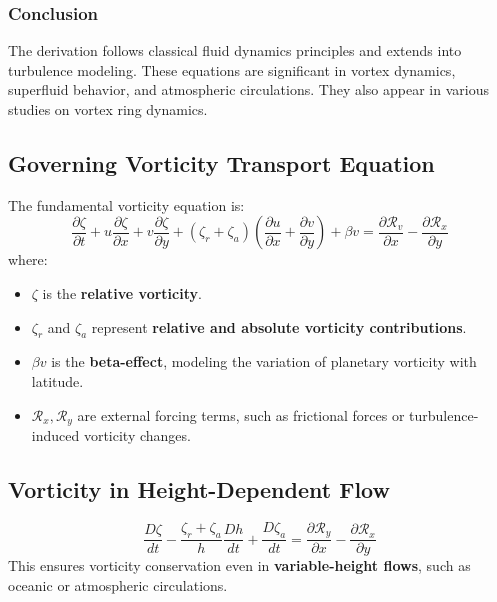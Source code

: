 \documentclass[12pt]{article}
\begin{document}
    \subsubsection*{Conclusion}
    The derivation follows classical fluid dynamics principles and extends into turbulence modeling. These equations are significant in vortex dynamics, superfluid behavior, and atmospheric circulations. They also appear in various studies on vortex ring dynamics.

    \subsection{Governing Vorticity Transport Equation}
    The fundamental vorticity equation is:
    \begin{equation}
        \frac{\partial \zeta}{\partial t} + u \frac{\partial \zeta}{\partial x} + v \frac{\partial \zeta}{\partial y} + \left( \zeta_r + \zeta_a \right) \left( \frac{\partial u}{\partial x} + \frac{\partial v}{\partial y} \right) + \beta v = \frac{\partial \mathcal{R}_v}{\partial x} - \frac{\partial \mathcal{R}_x}{\partial y}
    \end{equation}
    where:
    \begin{itemize}
        \item $\zeta$ is the \textbf{relative vorticity}.
        \item $\zeta_r$ and $\zeta_a$ represent \textbf{relative and absolute vorticity contributions}.
        \item $\beta v$ is the \textbf{beta-effect}, modeling the variation of planetary vorticity with latitude.
        \item $\mathcal{R}_x, \mathcal{R}_y$ are external forcing terms, such as frictional forces or turbulence-induced vorticity changes.
    \end{itemize}

    \subsection{Vorticity in Height-Dependent Flow}
    \begin{equation*}
        \frac{D \zeta}{d t} - \frac{ \zeta_r + \zeta_a }{h}  \frac{D h}{d t} + \frac{D \zeta_a}{d t}  = \frac{\partial \mathcal{R}_y}{\partial x} - \frac{\partial \mathcal{R}_x}{\partial y}
    \end{equation*}
    This ensures vorticity conservation even in \textbf{variable-height flows}, such as oceanic or atmospheric circulations.
\end{document}

